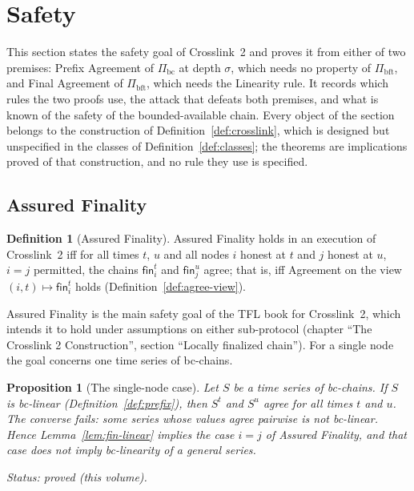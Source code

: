 \documentclass[11pt,a4paper]{article}
\newtheorem{proposition}[theorem]{Proposition}
\theoremstyle{definition}
\newtheorem{definition}[theorem]{Definition}
\newcommand{\bc}{\mathrm{bc}}
\newcommand{\bft}{\mathrm{bft}}
\newcommand{\Pibc}{\Pi_{\bc}}
\newcommand{\Pibft}{\Pi_{\bft}}
\newcommand{\fin}{\mathsf{fin}}
\begin{document}
\section{Safety}\label{sec:safety}

This section states the safety goal of Crosslink~2 and proves it from either
of two premises: Prefix Agreement of $\Pibc$ at depth $\sigma$, which needs
no property of $\Pibft$, and Final Agreement of $\Pibft$, which needs the
Linearity rule. It records which rules the two proofs use, the attack that
defeats both premises, and what is known of the safety of the
bounded-available chain. Every object of the section belongs to the
construction of Definition~\ref{def:crosslink}, which is designed but
unspecified in the classes of Definition~\ref{def:classes}; the theorems are
implications proved of that construction, and no rule they use is
specified.

\subsection{Assured Finality}\label{sec:saf-af}

\begin{definition}[Assured Finality]\label{def:af}
Assured Finality holds in an execution of Crosslink~2 iff for all times $t$,
$u$ and all nodes $i$ honest at $t$ and $j$ honest at $u$, $i = j$
permitted, the chains $\fin_i^t$ and $\fin_j^u$ agree; that is, iff
Agreement on the view $(i, t) \mapsto \fin_i^t$ holds
(Definition~\ref{def:agree-view}).
\end{definition}

Assured Finality is the main safety goal of the TFL book for Crosslink~2,
which intends it to hold under assumptions on either sub-protocol (chapter
``The Crosslink 2 Construction'', section ``Locally finalized chain''). For
a single node the goal concerns one time series of bc-chains.

\begin{proposition}[The single-node case]\label{prop:af-single}
Let $S$ be a time series of bc-chains. If $S$ is bc-linear
(Definition~\ref{def:prefix}), then $S^t$ and $S^u$ agree for all times $t$
and $u$. The converse fails: some series whose values agree pairwise is not
bc-linear. Hence Lemma~\ref{lem:fin-linear} implies the case $i = j$ of
Assured Finality, and that case does not imply bc-linearity of a general
series.

Status: proved (this volume).
\end{proposition}
\end{document}
